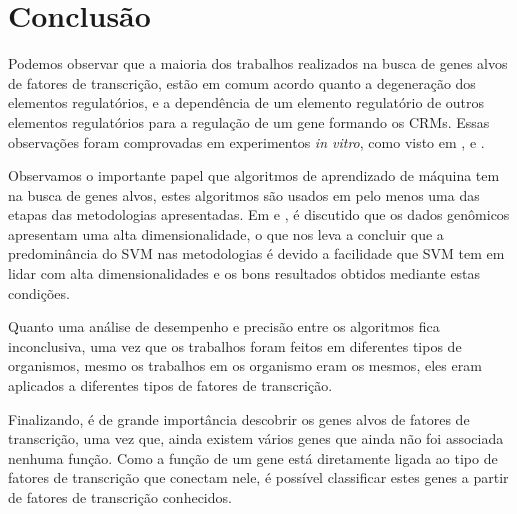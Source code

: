 \chapter{Conclusão}

Podemos observar que a maioria dos trabalhos realizados na busca de genes alvos de fatores de transcrição, estão em comum acordo quanto a degeneração dos elementos regulatórios, e a dependência de um elemento regulatório de outros elementos regulatórios para a regulação de um gene formando os CRMs. Essas observações foram comprovadas em experimentos \textit{in vitro}, como visto em \cite{Davidson1983},\cite{Priest2009} e \cite{Zhang2005}. 

Observamos o importante papel que algoritmos de aprendizado de máquina tem na busca de genes alvos, estes algoritmos são usados em pelo menos uma das etapas das metodologias apresentadas. Em \cite{Holloway2008} e \cite{Lan2007}, é discutido que os dados genômicos apresentam uma alta dimensionalidade, o que nos leva a concluir que a predominância do SVM nas metodologias é devido a facilidade que SVM tem em lidar com alta dimensionalidades e os bons resultados obtidos mediante estas condições.

Quanto uma análise de desempenho e precisão entre os algoritmos fica inconclusiva, uma vez que os trabalhos foram feitos em diferentes tipos de organismos, mesmo os trabalhos em os organismo eram os mesmos, eles eram aplicados a diferentes tipos de fatores de transcrição.

Finalizando, é de grande importância descobrir os genes alvos de fatores de transcrição, uma vez que, ainda existem vários genes que ainda não foi associada nenhuma função. Como a função de um gene está diretamente ligada ao tipo de fatores de transcrição que conectam nele, é possível classificar estes genes a partir de fatores de transcrição conhecidos.
